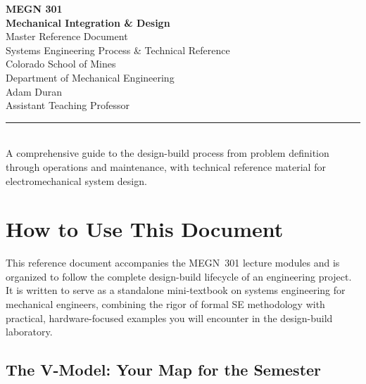 \documentclass[11pt,letterpaper,twoside,openany]{book}
\begin{document}
\begin{titlepage}
\begin{center}
\vspace*{2cm}
{\Huge\bfseries\sffamily\textcolor{MinesBlue}{MEGN 301}}\\[0.5cm]
{\Huge\bfseries\sffamily\textcolor{MinesBlue}{Mechanical Integration \& Design}}\\[2cm]
{\huge\sffamily\textcolor{MinesBlue}{Master Reference Document}}\\[1cm]
{\Large\sffamily Systems Engineering Process \& Technical Reference}\\[3cm]
{\large\sffamily\textcolor{MinesSilver}{Colorado School of Mines}}\\[0.3cm]
{\large\sffamily\textcolor{MinesSilver}{Department of Mechanical Engineering}}\\[1cm]
{\normalsize\sffamily Adam Duran}\\[0.2cm]
{\small\sffamily\textcolor{MinesSilver}{Assistant Teaching Professor}}\\[1.5cm]
\textcolor{MinesBlue}{\rule{0.6\textwidth}{1pt}}\\[0.5cm]
{\normalsize\sffamily A comprehensive guide to the design-build process from problem definition through operations and maintenance, with technical reference material for electromechanical system design.}
\end{center}
\end{titlepage}

\frontmatter
\tableofcontents
\newpage

\FloatBarrier
\chapter*{How to Use This Document}

This reference document accompanies the MEGN~301 lecture modules and is organized to follow the complete design-build lifecycle of an engineering project. It is written to serve as a standalone mini-textbook on systems engineering for mechanical engineers, combining the rigor of formal SE methodology with practical, hardware-focused examples you will encounter in the design-build laboratory.

\section*{The V-Model: Your Map for the Semester}
\end{document}
